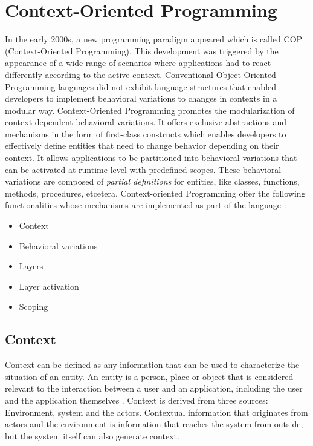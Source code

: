 \documentclass{acm_proc_article-sp}
\begin{document}
\section{Context-Oriented Programming}
\label{cop}
In the early 2000s, a new programming paradigm appeared which is called COP (Context-Oriented Programming). This development was triggered by the appearance of a wide range of scenarios where applications had to react differently according to the active context. Conventional Object-Oriented Programming languages did not exhibit language structures that enabled developers to implement behavioral variations to changes in contexts in a modular way. 
\pagebreak
Context-Oriented Programming promotes the modularization of context-\linebreak dependent behavioral variations. It offers exclusive abstractions and mechanisms in the form of first-class constructs which enables developers to effectively define entities that need to change behavior depending on their context. It allows applications to be partitioned into behavioral variations that can be activated at runtime level with predefined scopes. These behavioral variations are composed of \textit{partial definitions} for entities, like classes, functions, methods, procedures, etcetera. Context-oriented Programming offer the following functionalities whose mechanisms are implemented as part of the language \cite{Costanza:2008:CPC:1529966.1529970}:

\begin{itemize}
\item {Context}
\item Behavioral variations
\item Layers
\item Layer activation
\item Scoping
\end{itemize}

\subsection{Context}
\label{sec:context}
Context can be defined as any information that can be used to characterize the situation of an entity. An entity is a person, place or object that is considered relevant to the interaction between a user and an application, including the user and the application themselves \cite{Abowd:1999:TBU:647985.743843}. Context is derived from three sources: Environment, system and the actors. Contextual information that originates from actors and the environment is information that reaches the system from outside, but the system itself can also generate context. 
\end{document}
